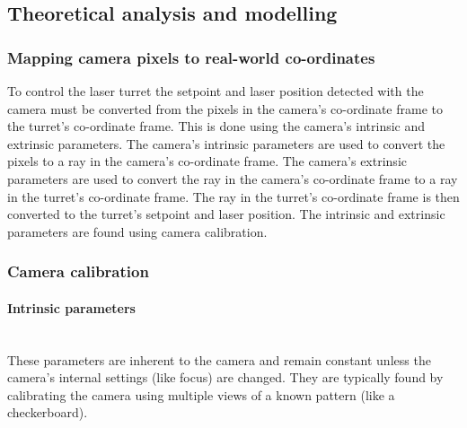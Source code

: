 \subsection{Theoretical analysis and modelling}

\subsubsection{Mapping camera pixels to real-world co-ordinates}
To control the laser turret the setpoint and laser position detected with the camera must be converted from the pixels in the camera's co-ordinate frame to the turret's co-ordinate frame. This is done using the camera's intrinsic and extrinsic parameters. The camera's intrinsic parameters are used to convert the pixels to a ray in the camera's co-ordinate frame. The camera's extrinsic parameters are used to convert the ray in the camera's co-ordinate frame to a ray in the turret's co-ordinate frame. The ray in the turret's co-ordinate frame is then converted to the turret's setpoint and laser position. The intrinsic and extrinsic parameters are found using camera calibration.

\subsubsection{Camera calibration}
\paragraph{Intrinsic parameters}\mbox{}\\
These parameters are inherent to the camera and remain constant unless the camera's internal settings (like focus) are changed. They are typically found by calibrating the camera using multiple views of a known pattern (like a checkerboard).

